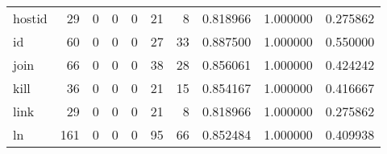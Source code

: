 \begin{tabular}{lrrrrrrrrr}
hostid    &                                        29 &                                                  0 &                                                  0 &                                                  0 &                                                 21 &                                                  8 &                                           0.818966 &                               1.000000 &                             0.275862 \\
id        &                                        60 &                                                  0 &                                                  0 &                                                  0 &                                                 27 &                                                 33 &                                           0.887500 &                               1.000000 &                             0.550000 \\
join      &                                        66 &                                                  0 &                                                  0 &                                                  0 &                                                 38 &                                                 28 &                                           0.856061 &                               1.000000 &                             0.424242 \\
kill      &                                        36 &                                                  0 &                                                  0 &                                                  0 &                                                 21 &                                                 15 &                                           0.854167 &                               1.000000 &                             0.416667 \\
link      &                                        29 &                                                  0 &                                                  0 &                                                  0 &                                                 21 &                                                  8 &                                           0.818966 &                               1.000000 &                             0.275862 \\
ln        &                                       161 &                                                  0 &                                                  0 &                                                  0 &                                                 95 &                                                 66 &                                           0.852484 &                               1.000000 &                             0.409938 \\

\end{tabular}
